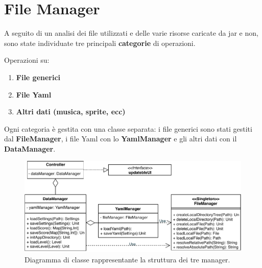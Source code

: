 \section{File Manager}
\label{sec:file_manager_design}
A seguito di un analisi dei file utilizzati e delle varie risorse caricate da jar e non, sono state individuate tre principali \textbf{categorie} di operazioni.

\hfill \break
Operazioni su:
\begin{enumerate}
    \item \textbf{File generici}
    \item \textbf{File Yaml}
    \item \textbf{Altri dati (musica, sprite, ecc)}
\end{enumerate}

Ogni categoria è gestita con una classe separata: i file generici sono stati gestiti dal \textbf{FileManager}, i file Yaml con lo \textbf{YamlManager} e gli altri dati con il \textbf{DataManager}.


\begin{figure}[H]
	\centering
	\includegraphics[width=0.90\columnwidth]{drawio/fileManager/fileManager.pdf}
	\caption{Diagramma di classe rappresentante la struttura dei tre manager.}
	\label{fig:FileManager}
\end{figure}

